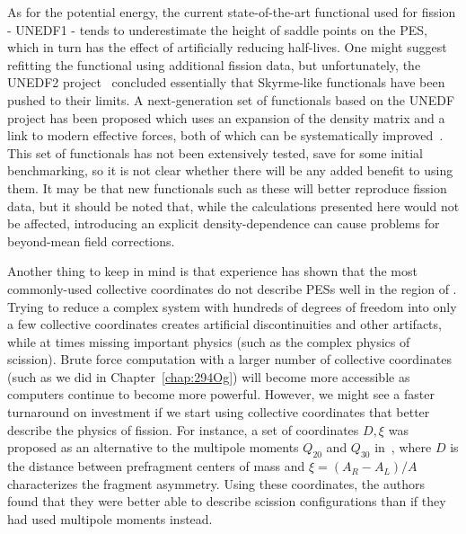 As for the potential energy, the current state-of-the-art functional used for fission - UNEDF1 - tends to underestimate the height of saddle points on the PES, which in turn has the effect of artificially reducing half-lives. One might suggest refitting the functional using additional fission data, but unfortunately, the UNEDF2 project~\cite{Kortelainen2014} concluded essentially that Skyrme-like functionals have been pushed to their limits. A next-generation set of functionals based on the UNEDF project has been proposed which uses an expansion of the density matrix and a link to modern effective forces, both of which can be systematically improved~\cite{NavarroPerez2018}. This set of functionals has not been extensively tested, save for some initial benchmarking, so it is not clear whether there will be any added benefit to using them. It may be that new functionals such as these will better reproduce fission data, but it should be noted that, while the calculations presented here would not be affected, introducing an explicit density-dependence can cause problems for beyond-mean field corrections. %

Another thing to keep in mind is that experience has shown that the most commonly-used collective coordinates do not describe PESs well in the region of {\Pt}. Trying to reduce a complex system with hundreds of degrees of freedom into only a few collective coordinates creates artificial discontinuities and other artifacts, while at times missing important physics (such as the complex physics of scission). Brute force computation with a larger number of collective coordinates (such as we did in Chapter~\ref{chap:294Og}) will become more accessible as computers continue to become more powerful. However, we might see a faster turnaround on investment if we start using collective coordinates that better describe the physics of fission. For instance, a set of coordinates $D, \xi$ was proposed as an alternative to the multipole moments $Q_{20}$ and $Q_{30}$ in~\cite{younes2012}, where $D$ is the distance between prefragment centers of mass and $\xi = (A_R-A_L)/A$ characterizes the fragment asymmetry. Using these coordinates, the authors found that they were better able to describe scission configurations than if they had used multipole moments instead. %

